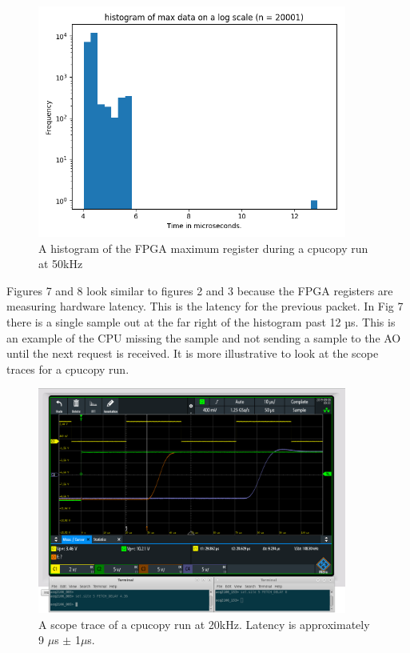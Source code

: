 \documentclass{article}
\begin{document}
\begin{figure}
	\centering
	\includegraphics[width=4.0in]{images/cpu_copy_50kHz.png}
	\caption{A histogram of the FPGA maximum register during a cpucopy run at 50kHz}
	\label{cpu50hist}
\end{figure}

Figures 7 and 8 look similar to figures 2 and 3 because the FPGA registers are measuring hardware latency.
This is the latency for the previous packet.
In Fig 7 there is a single sample out at the far right of the histogram past 12 µs.
This is an example of the CPU missing the sample and not sending a sample to the AO until the next request is received.
It is more illustrative to look at the scope traces for a cpucopy run.


\begin{figure}
	\centering
	\includegraphics[width=4.0in]{images/20kHz_annotated_scope_cpucopy.png}
	\caption{A scope trace of a cpucopy run at 20kHz. Latency is approximately 9 $\mu$s $\pm$ 1$\mu$s.}
	\label{cpu20scope}
\end{figure}
\end{document}
